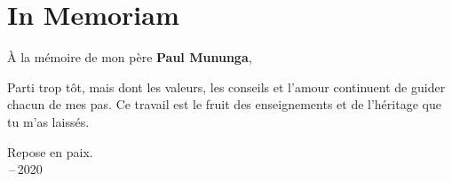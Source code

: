 \chapter*{In Memoriam}
\thispagestyle{empty}

\vspace*{3cm}

\begin{center}

À la mémoire de mon père \textbf{Paul Mununga},

Parti trop tôt, mais dont les valeurs, les conseils et l'amour continuent de guider chacun de mes pas. Ce travail est le fruit des enseignements et de l'héritage que tu m'as laissés.

Repose en paix. \\ \,--\,2020
\end{center}

\vspace{1.5cm}
\begin{flushright}
\myName
\end{flushright}
